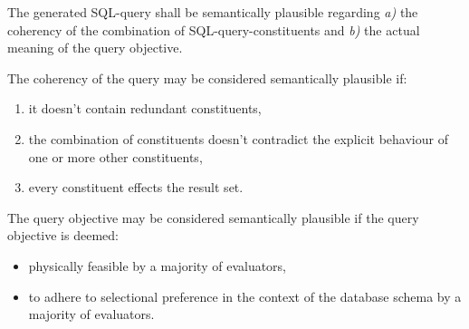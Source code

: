 The generated SQL-query shall be semantically plausible regarding \textit{a)} the coherency of the combination of SQL-query-constituents and \textit{b)} the actual meaning of the query objective.

The coherency of the query may be considered semantically plausible if: 

\begin{enumerate}
    \item it doesn't contain redundant constituents,  %
    \item the combination of constituents doesn't contradict the explicit behaviour of one or more other constituents,            %
    \item every constituent effects the result set.     %
\end{enumerate}

The query objective may be considered semantically plausible if the query objective is deemed: 

\begin{itemize}
    \item physically feasible by a majority of evaluators,
    \item to adhere to selectional preference in the context of the database schema by a majority of evaluators.
\end{itemize}